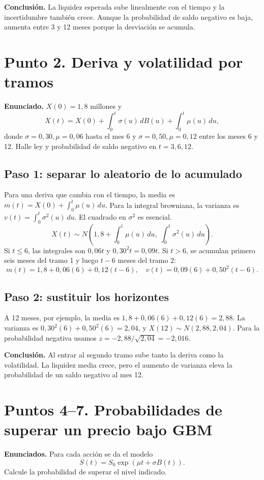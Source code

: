 \documentclass[11pt,a4paper]{article}
\begin{document}
\textbf{Conclusión.} La liquidez esperada sube linealmente con el tiempo y la incertidumbre también crece. Aunque la probabilidad de saldo negativo es baja, aumenta entre 3 y 12 meses porque la desviación se acumula.

\section*{Punto 2. Deriva y volatilidad por tramos}
\textbf{Enunciado.} \(X(0)=1{,}8\) millones y
\[
X(t)=X(0)+\int_0^t\sigma(u)\,dB(u)+\int_0^t\mu(u)\,du,
\]
donde \(\sigma=0{,}30,\mu=0{,}06\) hasta el mes 6 y \(\sigma=0{,}50,\mu=0{,}12\) entre los meses 6 y 12. Halle ley y probabilidad de saldo negativo en \(t=3,6,12\).

\subsection*{Paso 1: separar lo aleatorio de lo acumulado}
Para una deriva que cambia con el tiempo, la media es \(m(t)=X(0)+\int_0^t\mu(u)\,du\). Para la integral browniana, la varianza es \(v(t)=\int_0^t\sigma^2(u)\,du\). El cuadrado en \(\sigma^2\) es esencial.
\[
X(t)\sim N\left(1{,}8+\int_0^t\mu(u)\,du,\;\int_0^t\sigma^2(u)\,du\right).
\]
Si \(t\le6\), las integrales son \(0{,}06t\) y \(0{,}30^2t=0{,}09t\). Si \(t>6\), se acumulan primero seis meses del tramo 1 y luego \(t-6\) meses del tramo 2:
\[
m(t)=1{,}8+0{,}06(6)+0{,}12(t-6),\quad
v(t)=0{,}09(6)+0{,}50^2(t-6).
\]

\subsection*{Paso 2: sustituir los horizontes}
A 12 meses, por ejemplo, la media es \(1{,}8+0{,}06(6)+0{,}12(6)=2{,}88\). La varianza es \(0{,}30^2(6)+0{,}50^2(6)=2{,}04\), y \(X(12)\sim N(2{,}88,2{,}04)\). Para la probabilidad negativa usamos \(z=-2{,}88/\sqrt{2{,}04}=-2{,}016\).

\textbf{Conclusión.} Al entrar al segundo tramo sube tanto la deriva como la volatilidad. La liquidez media crece, pero el aumento de varianza eleva la probabilidad de un saldo negativo al mes 12.

\section*{Puntos 4--7. Probabilidades de superar un precio bajo GBM}
\textbf{Enunciados.} Para cada acción se da el modelo
\[
S(t)=S_0\exp(\mu t+\sigma B(t)).
\]
Calcule la probabilidad de superar el nivel indicado.
\end{document}
